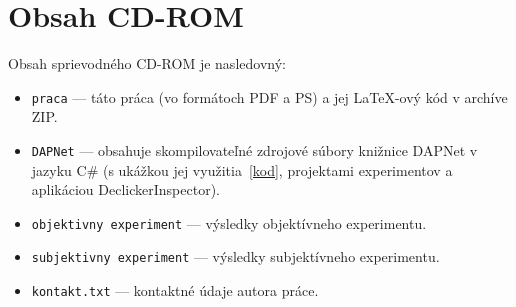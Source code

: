 
\chapter{Obsah CD-ROM}

Obsah sprievodného CD-ROM je nasledovný:
\begin{itemize}
	\item \texttt{praca} --- táto práca (vo formátoch PDF a PS) a jej \LaTeX-ový kód v archíve ZIP.
	\item \texttt{DAPNet} --- obsahuje skompilovateľné zdrojové súbory knižnice DAPNet v jazyku C\# (s ukážkou jej využitia~\ref{kod}, projektami experimentov a aplikáciou DeclickerInspector).
	\item \texttt{objektivny experiment} --- výsledky objektívneho experimentu.
	\item \texttt{subjektivny experiment} --- výsledky subjektívneho experimentu.
	\item \texttt{kontakt.txt} --- kontaktné údaje autora práce.
\end{itemize}

